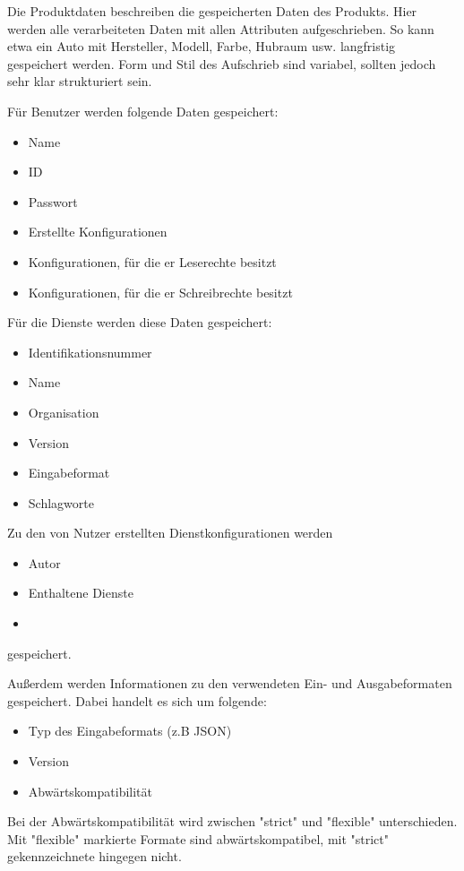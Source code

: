 \begin{tcolorbox}
Die Produktdaten beschreiben die gespeicherten Daten des Produkts. 
Hier werden alle verarbeiteten Daten mit allen Attributen aufgeschrieben.
So kann etwa ein Auto mit Hersteller, Modell, Farbe, Hubraum usw. langfristig gespeichert werden.
Form und Stil des Aufschrieb sind variabel, sollten jedoch sehr klar strukturiert sein.

Für Benutzer werden folgende Daten gespeichert:
\begin{itemize}
	\item Name
	\item ID
	\item Passwort
	\item Erstellte Konfigurationen
	\item Konfigurationen, für die er Leserechte besitzt
	\item Konfigurationen, für die er Schreibrechte besitzt
\end{itemize}

Für die Dienste werden diese Daten gespeichert:
\begin{itemize}
	\item Identifikationsnummer
	\item Name
	\item Organisation
	\item Version
	\item Eingabeformat
	\item Schlagworte
\end{itemize}

Zu den von Nutzer erstellten Dienstkonfigurationen werden
\begin{itemize}
	\item Autor
	\item Enthaltene Dienste
	\item 
\end{itemize}
gespeichert.

Außerdem werden Informationen zu den verwendeten Ein- und Ausgabeformaten gespeichert. Dabei handelt es sich um folgende:
\begin{itemize}
	\item Typ des Eingabeformats (z.B JSON)
	\item Version
	\item Abwärtskompatibilität
\end{itemize}

Bei der Abwärtskompatibilität wird zwischen "strict" und "flexible" unterschieden. Mit "flexible" markierte Formate sind abwärtskompatibel, mit "strict" gekennzeichnete hingegen nicht.


\end{tcolorbox}